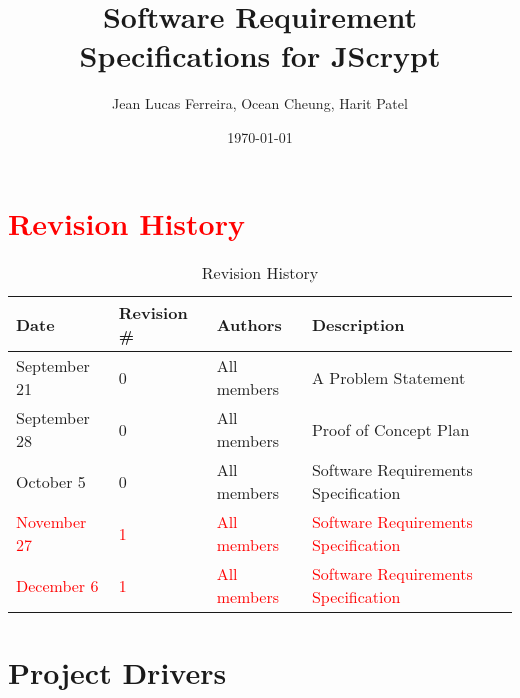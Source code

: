 \documentclass[12pt]{article}
\begin{document}
\title{Software Requirement Specifications for JScrypt}
\author{Jean Lucas Ferreira, Ocean Cheung, Harit Patel}

\date{\today}

\maketitle


\newpage
  \tableofcontents

\newpage


\section*{}

\section{\textcolor{red}{Revision History}}
\begin{table}[H]
\centering
      \caption{Revision History}
        \label{tab:table2}
      \begin{tabular}{ | p{4cm} | p{2cm} | p{4cm} | p{4cm}  | }
        \hline
            \textbf{Date} & \textbf{Revision \#} & \textbf{Authors} & \textbf{Description} \\
        \hline
          September 21 & 0 & All members & A Problem Statement  \\
        \hline
          September 28 & 0 & All members & Proof of Concept Plan \\
        \hline
          October 5 & 0 & All members & Software Requirements Specification \\
        \hline

        \textcolor{red}{ November 27} & \textcolor{red}{1} & \textcolor{red}{All members} & \textcolor{red}{Software Requirements Specification} \\

        \hline
         \textcolor{red}{ December 6} & \textcolor{red}{1} & \textcolor{red}{All members} & \textcolor{red}{Software Requirements Specification} \\
        \hline


      \end{tabular}
  \end{table}


\section*{Project Drivers}
\end{document}
